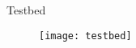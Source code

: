 \begin{frame}{Testbed}

  \begin{figure}
    \centering
    \texttt{[image: testbed]}
  \end{figure}

\end{frame}